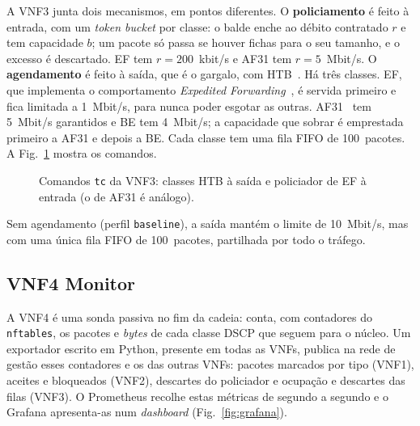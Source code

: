 \documentclass[a4paper]{llncs}
\begin{document}
A VNF3 junta dois mecanismos, em pontos diferentes. O \textbf{policiamento} é feito à
entrada, com um \emph{token bucket} por classe: o balde enche ao débito contratado
$r$ e tem capacidade $b$; um pacote só passa se houver fichas para o seu tamanho, e o
excesso é descartado. EF tem $r = 200$~kbit/s e AF31 tem $r = 5$~Mbit/s. O
\textbf{agendamento} é feito à saída, que é o gargalo, com HTB~\cite{htb}. Há três
classes. EF, que implementa o comportamento \emph{Expedited
Forwarding}~\cite{rfc3246}, é servida primeiro e fica limitada a 1~Mbit/s, para nunca
poder esgotar as outras. AF31~\cite{rfc2597} tem 5~Mbit/s garantidos e BE tem
4~Mbit/s; a capacidade que sobrar é emprestada primeiro a AF31 e depois a BE. Cada
classe tem uma fila FIFO de 100~pacotes. A Fig.~\ref{fig:tc} mostra os comandos.

\begin{figure}[!tb]
\caption{Comandos \texttt{tc} da VNF3: classes HTB à saída e policiador de EF à entrada
(o de AF31 é análogo).}
\label{fig:tc}
\end{figure}

Sem agendamento (perfil \texttt{baseline}), a saída mantém o limite de 10~Mbit/s, mas
com uma única fila FIFO de 100~pacotes, partilhada por todo o tráfego.

\subsection{VNF4 Monitor}

A VNF4 é uma sonda passiva no fim da cadeia: conta, com contadores do
\texttt{nftables}, os pacotes e \emph{bytes} de cada classe DSCP que seguem para o
núcleo. Um exportador escrito em Python, presente em todas as VNFs, publica na rede de
gestão esses contadores e os das outras VNFs: pacotes marcados por tipo (VNF1),
aceites e bloqueados (VNF2), descartes do policiador e ocupação e descartes das filas
(VNF3). O Prometheus recolhe estas métricas de segundo a segundo e o Grafana
apresenta-as num \emph{dashboard} (Fig.~\ref{fig:grafana}).
\end{document}

